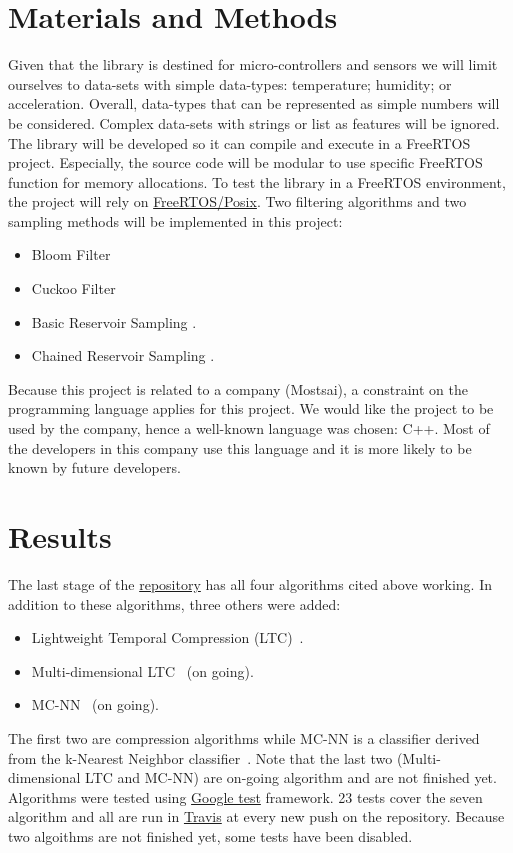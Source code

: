 \documentclass{article}
\newcommand{\note}[1]{
	\marginpar{
		\parbox{18mm}{
			\flushleft
				\tiny\textbf{\textcolor{red}{TODO}}: #1
		}
	}
}
\begin{document}
\section{Materials and Methods}
Given that the library is destined for micro-controllers and sensors we will limit ourselves to data-sets
with simple data-types: temperature; humidity; or acceleration. Overall, data-types that can be represented as simple numbers
will be considered. Complex data-sets with strings or list as features will be ignored.
The library will be developed so it can compile and execute in a FreeRTOS project.
Especially, the source code will be modular to use specific FreeRTOS function for memory allocations.
To test the library in a FreeRTOS environment, the project will rely on
\href{https://www.freertos.org/FreeRTOS-simulator-for-Linux.html}{FreeRTOS/Posix}.
Two filtering algorithms and two sampling methods will be implemented in this project:
\begin{itemize}
	\item Bloom Filter \cite{bloom}
	\item Cuckoo Filter \cite{cuckoo_filter}
	\item Basic Reservoir Sampling \cite{reservoir_sampling}.
	\item Chained Reservoir Sampling \cite{chained_reservoir_sampling}.
\end{itemize}
Because this project is related to a company (Mostsai), a constraint on the programming language applies for this project.
We would like the project to be used by the company, hence a well-known language was chosen: C++. Most of the developers
in this company use this language and it is more likely to be known by future developers.
\note{What will you measure?}

\section{Results}
The last stage of the \href{https://github.com/azazel7/OrpailleCC}{repository} has all four algorithms cited above working.
In addition to these algorithms, three others were added:
\begin{itemize}
	\item Lightweight Temporal Compression (LTC)~\cite{ltc}.
	\item Multi-dimensional LTC~\cite{multi-ltc} (on going).
	\item MC-NN~\cite{mc-nn} (on going).
\end{itemize}
The first two are compression algorithms while MC-NN is a classifier derived
from the k-Nearest Neighbor classifier~\cite{kNN}. Note that the last two
(Multi-dimensional LTC and MC-NN) are on-going algorithm and are not finished
yet. Algorithms were tested using
\href{https://github.com/abseil/googletest}{Google test} framework. 23 tests
cover the seven algorithm and all are run in
\href{https://travis-ci.org/azazel7/OrpailleCC}{Travis} at every new push on
the repository. Because two algoithms are not finished yet, some tests have
been disabled.
\end{document}
